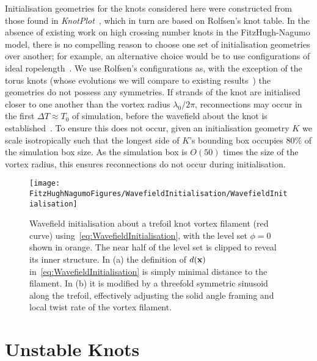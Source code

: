 Initialisation geometries for the knots considered here were constructed from those found in \emph{KnotPlot}~\citep{KnotPlot}, which in turn are based on Rolfsen's knot table. In the absence of existing work on high crossing number knots in the FitzHugh-Nagumo model, there is no compelling reason to choose one set of initialisation geometries over another; for example, an alternative choice would be to use configurations of ideal ropelength~\citep{Cantarella2011,Kleckner2016,Maucher2017}. We use Rolfsen's configurations as, with the exception of the torus knots (whose evolutions we will compare to existing results~\citep{Maucher2017}) the geometries do not possess any symmetries. If strands of the knot are initialised closer to one another than the vortex radius $\lambda_0 /2\pi$, reconnections may occur in the first $\Delta T \approx T_0$ of simulation, before the wavefield about the knot is established~\citep{Maucher2016}. To ensure this does not occur, given an initialisation geometry $K$ we scale isotropically such that the longest side of $K$'s bounding box occupies $80\%$ of the simulation box size. As the simulation box is $O(50)$ times the size of the vortex radius, this ensures reconnections do not occur during initialisation. 

\begin{figure}[htbp]
\centering
\texttt{[image: \\FitzHughNagumoFigures/WavefieldInitialisation/WavefieldInitialisation]}
\caption[Initialising a wavefield around a trefoil vortex.]{Wavefield initialisation about a trefoil knot vortex filament (red curve) using~\eqref{eq:WavefieldInitialisation}, with the level set $\phi = 0 $ shown in orange. The near half of the level set is clipped to reveal its inner structure. In (a) the definition of $d({\bf x})$ in~\eqref{eq:WavefieldInitialisation} is simply minimal distance to the filament. In (b) it is modified by a threefold symmetric sinusoid along the trefoil, effectively adjusting the solid angle framing and local twist rate of the vortex filament.}
\label{fig:WavefieldInitialisation}
\end{figure}


\section{\label{sec:UnstableKnots}Unstable Knots}

